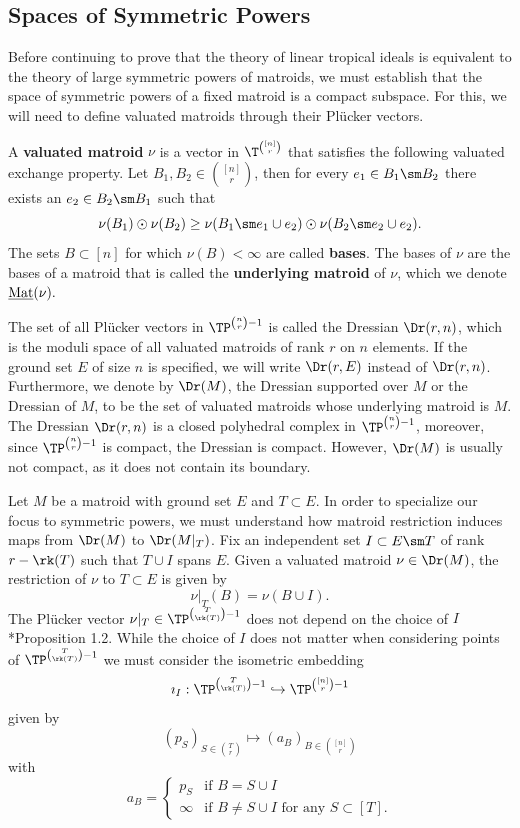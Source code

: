 \subsection{Spaces of Symmetric Powers}\label{subsec:SpacesofSymPow}
Before continuing to prove that the theory of linear tropical ideals is equivalent to the theory of large symmetric powers of matroids, we must establish that the space of symmetric powers of a fixed matroid is a compact subspace. For this, we will need to define valuated matroids through their Pl\"ucker vectors.

\begin{definition}\label{def:valuatedMatroid}
   A \textbf{valuated matroid} $\nu$ is a vector in $\T^{\binom{[n]}{r}}$ that satisfies the following valuated exchange property. Let $B_1,B_2\in \binom{[n]}{r}$, then for every $e_1\in B_1\sm B_2$ there exists an $e_2\in B_2\sm B_1$ such that
    \begin{equation}\label{eqn:basisExchange}
    \nu(B_1)\odot\nu(B_2)\geq \nu(B_1\sm e_1\cup e_2)\odot\nu(B_2\sm e_2\cup e_2).
    \end{equation}
    The sets $B\subset [n]$ for which $\nu(B)<\infty$ are called \textbf{bases}. The bases of $\nu$ are the bases of a matroid that is called the \textbf{underlying matroid} of $\nu$, which we denote $\operatorname{\underline{Mat}}(\nu).$
\end{definition}

The set of all Pl\"ucker vectors in $\TP^{\binom{n}{r}-1}$ is called the Dressian $\Dr(r,n)$, which is the moduli space of all valuated matroids of rank $r$ on $n$ elements. If the ground set $E$ of size $n$ is specified, we will write $\Dr(r,E)$ instead of $\Dr(r,n)$. Furthermore, we denote by $\Dr(M)$, the Dressian supported over $M$ or the Dressian of $M$, to be the set of valuated matroids whose underlying matroid is $M$. The Dressian $\Dr(r,n)$ is a closed polyhedral complex in $\TP^{\binom{n}{r}-1}$, moreover, since $\TP^{\binom{n}{r}-1}$ is compact, the Dressian is compact. However, $\Dr(M)$ is usually not compact, as it does not contain its boundary.

Let $M$ be a matroid with ground set $E$ and $T\subset E$. In order to specialize our focus to symmetric powers, we must understand how matroid restriction induces maps from $\Dr(M)$ to $\Dr(M|_T)$. Fix an independent set $I\subset E\sm T$ of rank $r-\rk(T)$ such that $T\cup I$ spans $E$. Given a valuated matroid $\nu\in \Dr(M)$, the restriction of $\nu$ to $T\subset E$ is given by
$$\nu|_T(B) = \nu(B\cup I).$$
The Pl\"ucker vector $\nu|_T\in \TP^{\binom{T}{\rk(T)}-1}$ does not depend on the choice of $I$ \cite{DW92}*{Proposition 1.2}. While the choice of $I$ does not matter when considering points of $\TP^{\binom{T}{\rk(T)}-1}$ we must consider the isometric embedding 
$$\imath_I:\TP^{\binom{T}{\rk(T)}-1}\hookrightarrow\TP^{\binom{[n]}{r}-1}$$ 
given by
 $$ (p_S)_{S\in\binom{T}{r}}\mapsto (a_B)_{B\in \binom{[n]}{r}} $$
 with
 $$a_B = \begin{cases}
 p_S & \text{if } B=S\cup I\\
 \infty & \text{if } B\neq S\cup I \text{ for any } S\subset [T].
 \end{cases}$$

